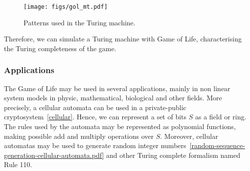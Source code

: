 \documentclass[12pt]{article}
\begin{document}

\begin{figure}[h]
    \centering
    \texttt{[image: figs/gol\_mt.pdf]}
    \caption{Patterns used in the Turing machine.}
    \label{fig:gol_mt}
\end{figure}

Therefore, we can simulate a Turing machine with Game of Life, characterising the Turing completeness of the game.


\subsubsection{Applications}

The Game of Life may be used in several applications, mainly in non linear system models in physic, mathematical, biological and other fields. More precisely, a cellular automata can be used in a private-public cryptosystem~\ref{cellular}. Hence, we can represent a set of bits $S$ as a field or ring. The rules used by the automata may be represented as polynomial functions, making possible add and multiply operations over $S$. Moreover, cellular automatas may be used to generate random integer numbers~\ref{random-sequence-generation-cellular-automata.pdf} and other Turing complete formalism named Rule 110.

\end{document}
